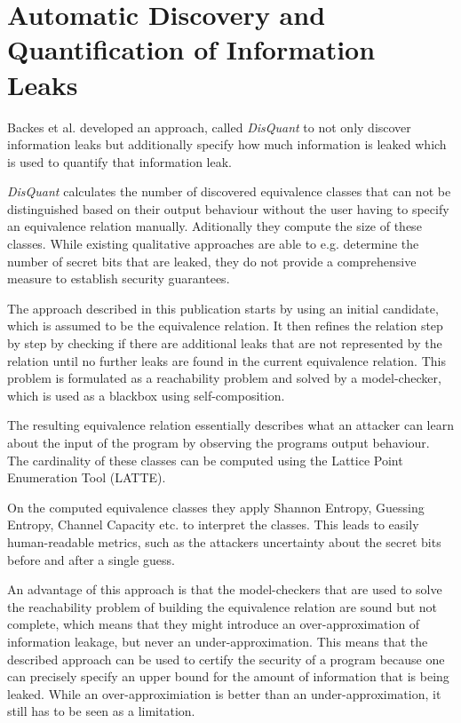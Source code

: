 \documentclass[a4paper,UKenglish]{lipics-v2018}
\begin{document}


\section{Automatic Discovery and Quantification of Information Leaks}

Backes et al. developed an approach, called \textit{DisQuant} to not only discover information leaks but additionally specify how much information is leaked which is used to quantify that information leak.\cite{automatic_discovery_and_quantification}

\textit{DisQuant} calculates the number of discovered equivalence classes that can not be distinguished based on their output behaviour without the user having to specify an equivalence relation manually. Aditionally they compute the size of these classes. While existing qualitative approaches are able to e.g. determine the number of secret bits that are leaked, they do not provide a comprehensive measure to establish security guarantees.\cite{automatic_discovery_and_quantification}

The approach described in this publication starts by using an initial candidate, which is assumed to be the equivalence relation. It then refines the relation step by step by checking if there are additional leaks that are not represented by the relation until no further leaks are found in the current equivalence relation. This problem is formulated as a reachability problem and solved by a model-checker, which is used as a blackbox using self-composition.\cite{automatic_discovery_and_quantification}

The resulting equivalence relation essentially describes what an attacker can learn about the input of the program by observing the programs output behaviour. The cardinality of these classes can be computed using the Lattice Point Enumeration Tool (LATTE).\cite{automatic_discovery_and_quantification}

On the computed equivalence classes they apply Shannon Entropy, Guessing Entropy, Channel Capacity etc. to interpret the classes. This leads to easily human-readable metrics, such as the attackers uncertainty about the secret bits before and after a single guess.\cite{automatic_discovery_and_quantification}

An advantage of this approach is that the model-checkers that are used to solve the reachability problem of building the equivalence relation are sound but not complete, which means that they might introduce an over-approximation of information leakage, but never an under-approximation. This means that the described approach can be used to certify the security of a program because one can precisely specify an upper bound for the amount of information that is being leaked.\cite{automatic_discovery_and_quantification} While an over-approximiation is better than an under-approximation, it still has to be seen as a limitation.
\end{document}
